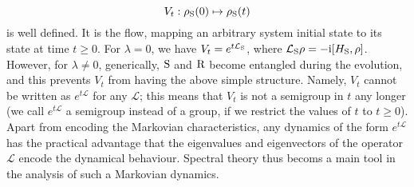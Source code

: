 \documentclass[letterpaper,onecolumn,11pt,accepted=2021-12-09]{quantumarticle}
\numberwithin{equation}{section}
\renewcommand{\r}{{\rm R}}
\newcommand{\s}{{\rm S}}
\renewcommand{\i}{{\rm i}}
\begin{document}
$$
V_t : \rho_\s(0) \mapsto \rho_\s(t)
$$
is well defined. It is the flow, mapping an arbitrary system initial state to its state at time $t\ge0$.  For $\lambda=0$, we have $V_t=e^{t {\mathcal L}_\s}$, where ${\mathcal L}_\s\rho = -\i [H_\s,\rho]$. However, for $\lambda\neq 0$, generically, $\s$ and $\r$ become entangled during the evolution, and this prevents $V_t$ from having the above simple structure. Namely, $V_t$ cannot be written as $e^{t {\mathcal L}}$ for any ${\mathcal L}$; this means that $V_t$ is not a semigroup in $t$ any longer (we call $e^{t{\mathcal L}}$ a semigroup instead of a group, if we restrict the values of $t$ to $t\ge0$). Apart from encoding the Markovian characteristics, any dynamics of the form $e^{t\mathcal L}$ has the practical advantage that the eigenvalues and eigenvectors of the operator $\mathcal L$ encode the dynamical behaviour. Spectral theory thus becoms a  main tool in the analysis of such a Markovian dynamics.



\bigskip
\end{document}
